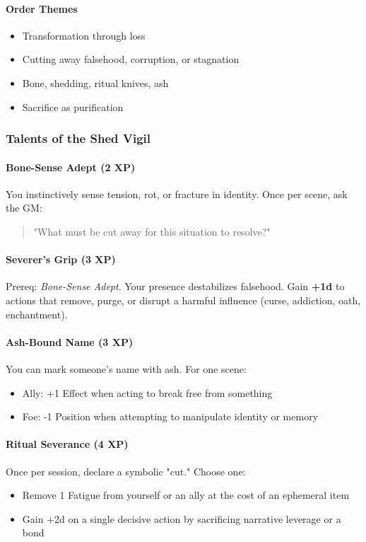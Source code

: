 \documentclass[11pt]{book}
\begin{document}
\paragraph{Order Themes}
\begin{itemize}[leftmargin=*]
    \item Transformation through loss  
    \item Cutting away falsehood, corruption, or stagnation  
    \item Bone, shedding, ritual knives, ash  
    \item Sacrifice as purification  
\end{itemize}

\subsubsection{Talents of the Shed Vigil}

\paragraph{Bone-Sense Adept (2 XP)}
You instinctively sense tension, rot, or fracture in identity.  
Once per scene, ask the GM:
\begin{quote}
    "What must be cut away for this situation to resolve?"
\end{quote}

\paragraph{Severer's Grip (3 XP)}
Prereq: \emph{Bone-Sense Adept}.  
Your presence destabilizes falsehood.  
Gain \textbf{+1d} to actions that remove, purge, or disrupt a harmful influence (curse, addiction, oath, enchantment).

\paragraph{Ash-Bound Name (3 XP)}
You can mark someone's name with ash.  
For one scene:
\begin{itemize}[leftmargin=*]
    \item Ally: +1 Effect when acting to break free from something  
    \item Foe: -1 Position when attempting to manipulate identity or memory  
\end{itemize}

\paragraph{Ritual Severance (4 XP)}
Once per session, declare a symbolic "cut."  
Choose one:
\begin{itemize}[leftmargin=*]
    \item Remove 1 Fatigue from yourself or an ally at the cost of an ephemeral item  
    \item Gain +2d on a single decisive action by sacrificing narrative leverage or a bond  
\end{itemize}
\end{document}

